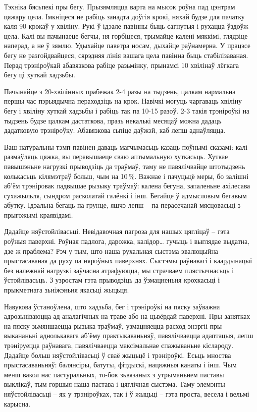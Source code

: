 Тэхніка бясьпекі пры бегу. Прызямляцца варта на мысок роўна пад цэнтрам цяжару цела. Імкніцеся не рабіць занадта доўгія крокі, няхай будзе для пачатку каля 90 крокаў у хвіліну. Рукі ў ідэале павінны быць сагнутыя і рухацца ўздоўж цела. Калі вы пачынаеце бегчы, ня горбіцеся, трымайце калені мяккімі, глядзіце наперад, а не ў зямлю. Удыхайце паветра носам, дыхайце раўнамерна. У працэсе бегу не разгойдвайцеся, сярэдняя лінія вашага цела павінна быць стабілізаваная. Перад трэніроўкай абавязкова рабіце разьмінку, прынамсі 10 хвілінаў лёгкага бегу ці хуткай хадзьбы.

Пачынайце з 20-хвілінных прабежак 2-4 разы на тыдзень, цалкам нармальна першы час пэрыядычна пераходзіць на крок. Навічкі могуць чаргаваць хвіліну бегу і хвіліну хуткай хадзьбы і рабіць так па 10-15 разоў. 2-3 такія трэніроўкі на тыдзень будзе цалкам дастаткова, празь некалькі месяцаў можна дадаць дадатковую трэніроўку. Абавязкова сьпіце даўжэй, каб лепш аднаўляцца.

Ваш натуральны тэмп павінен даваць магчымасьць казаць поўнымі сказамі: калі размаўляць цяжка, вы перавышаеце сваю аптымальную хуткасьць. Хуткае павышэньне нагрузкі прыводзіць да траўмаў, таму не павялічвайце штотыдзень колькасьць кілямэтраў больш, чым на 10\,\%. Важнае і пачуцьцё меры, бо залішні аб'ём трэніровак падвышае рызыку траўмаў: калена бегуна, запаленьне ахілесава сухажыльля, сындром расколатай галёнкі і інш. Бегайце ў адмысловым бегавым абутку. Ідэальна бегаць па грунце, яшчэ лепш – па перасечанай мясцовасьці з прыгожымі краявідамі.

Дадайце няўстойлівасьці. Невідавочная пагроза для нашых цягліцаў – гэта роўныя паверхні. Роўная падлога, дарожка, калідор… гучыць і выглядае выдатна, дзе ж праблема? Рэч у тым, што наша рухальная сыстэма эвалюцыйна прыстасаваная да руху па няроўных паверхнях. Сыстэмы раўнавагі і каардынацыі без належнай нагрузкі заўчасна атрафуюцца, мы страчваем плястычнасьць і ўстойлівасьць. З узростам гэта прыводзіць да ўзмацненьня крохкасьці і прыкметнага зьніжэньня якасьці жыцьця.

Навукова ўстаноўлена, што хадзьба, бег і трэніроўкі на пяску заўважна адрозьніваюцца ад аналагічных на траве або на цьвёрдай паверхні. Пры занятках на пяску зьмяншаецца рызыка траўмаў, узмацняецца расход энэргіі пры выкананьні аднолькавага аб'ёму практыкаваньняў, павялічваецца адаптацыя, лепш трэніруецца раўнавага, павялічваецца максімальнае спажываньне кіслароду. Дадайце больш няўстойлівасьці ў сваё жыцьцё і трэніроўкі. Ёсьць мноства прыстасаваньняў: балянсіры, батуты, фітдыскі, нацяжныя канаты і інш. Чым менш вакол нас пастуральных, то-бок зьвязаных з утрыманьнем паставы выклікаў, тым горшыя наша пастава і цяглічная сыстэма. Таму элемэнты няўстойлівасьці – як у трэніроўках, так і ў жыцьці – гэта проста, весела і вельмі карысна.

